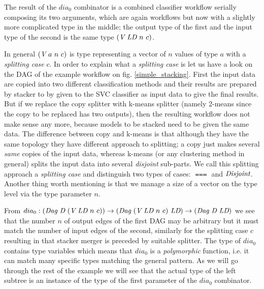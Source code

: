 \documentclass{ws-ijait}
\begin{document}
The result of the $dia_0$ combinator is a combined classifier workflow serially composing its two arguments, which are again workflows but now with a slightly more complicated type in the middle; 
the output type of the first and the input type of the second is the same type $(\textit{V}\ \textit{LD}\ n\ c)$. 

In general $(\textit{V}\ a\ n\ c)$ is type representing a vector of $n$ values of type $a$ 
with a \textit{splitting case} $c$.
In order to explain what a \textit{splitting case} is let us have a look on the DAG of the example workflow on fig. \ref{simple_stacking}. First the input data are copied into two different classification methods and their results are prepared by stacker to by given to the SVC classifier as input data to give the final results. But if we replace the copy splitter with k-means splitter (namely 2-means since the copy to be replaced has two outputs), then the resulting workflow does not make sense any more, because models to be stacked need to be given the same data. The difference between copy and k-means is that although they have the same topology they have different approach to splitting; a copy just makes several \textit{same} copies of the input data, whereas k-means (or any clustering method in general) splits the input data into several \textit{disjoint} sub-parts. We call this splitting approach a \textit{splitting case} and distinguish two types of cases: $\Same$ and $\textit{Disjoint}$. Another thing worth mentioning is that we manage a size of a vector on the type level via the type parameter $n$.

From $dia_0 : (\textit{Dag}\ \textit{D}\ (\textit{V}\ \textit{LD}\ n\ c)) \rightarrow (\textit{Dag}\ (\textit{V}\ \textit{LD}\ n\ c)\ \textit{LD}) \rightarrow (\textit{Dag}\ \textit{D}\ \textit{LD})$ we see that
the number $n$ of output edges of the first DAG may be arbitrary but it must match the number of input edges of the second, similarly for the splitting case $c$ resulting in that stacker merger is preceded by suitable splitter. The type of $dia_0$ contains type variables which means that $dia_0$ is a \textit{polymorphic} function, i.e. it can match many specific types matching the general pattern. 
As we will go through the rest of the example we will see that the actual type of the left subtree is an instance of the type of the first parameter of the $dia_0$ combinator.






\end{document}

